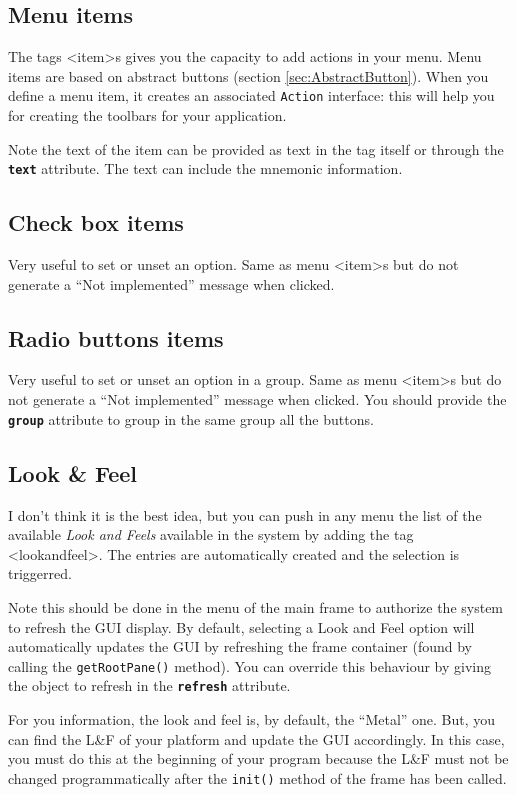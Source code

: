 \documentclass[a4paper,onecolumn,10pt]{book}
\newcommand{\jmethod}[1]{\texttt{\small #1()}}
\newcommand{\jclass}[1]{\texttt{\small #1}}
\newcommand{\tag}[1]{\textsf{<#1>}}
\newcommand{\attr}[1]{\texttt{\small \textbf{#1}}}
\begin{document}
\subsection{\label{sec:JMenuItem}Menu items}
The tags \tag{item}s gives you the capacity to add actions in your menu. Menu
items are based on abstract buttons (section \ref{sec:AbstractButton}). When
you define a menu item, it creates an associated \jclass{Action} interface:
this will help you for creating the toolbars for your application.

Note the text of the item can be provided as text in the tag itself or through
the \attr{text} attribute. The text can include the mnemonic information.

\subsection{\label{sec:JCheckBoxMenuItems}Check box items}
Very useful to set or unset an option. Same as menu \tag{item}s but do
not generate a ``Not implemented'' message when clicked.

\subsection{\label{sec:JRadioButtonMenuItems}Radio buttons items}
Very useful to set or unset an option in a group. Same as menu \tag{item}s but do
not generate a ``Not implemented'' message when clicked. You should
provide the \attr{group} attribute to group in the same group all the buttons.

 
\subsection{Look \& Feel}
I don't think it is the best idea, but you can push in any menu the
list of the available \emph{Look and Feels} available in the system
by adding the tag \tag{lookandfeel}. The entries are automatically
created and the selection is triggerred.

Note this should be done in the menu of the main frame to authorize
the system to refresh the GUI display. By default, selecting a Look 
and Feel option will automatically updates the GUI by refreshing the
frame container (found by calling the \jmethod{getRootPane} method).
You can override this behaviour by giving the object to refresh in
the \attr{refresh} attribute.

For you information, the look and feel is, by default, the ``Metal''
one. But, you can find the L\&F of your platform and update the
GUI accordingly. In this case, you must do this at the beginning of
your program because the L\&F must not be changed programmatically
after the \jmethod{init} method of the frame has been called.
\end{document}
